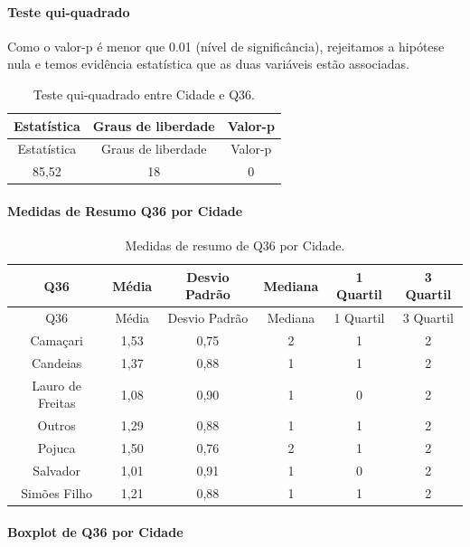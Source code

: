 \documentclass[]{article}
\let\oldparagraph\paragraph
\renewcommand{\paragraph}[1]{\oldparagraph{#1}\mbox{}}
\begin{document}
\hypertarget{teste-qui-quadrado-112}{%
\paragraph{Teste qui-quadrado}\label{teste-qui-quadrado-112}}

Como o valor-p é menor que 0.01 (nível de significância), rejeitamos a hipótese nula e temos evidência estatística que as duas variáveis estão associadas.

\begin{longtable}[]{@{}ccc@{}}
\caption{\label{tab:unnamed-chunk-1314}Teste qui-quadrado entre Cidade e Q36.}\tabularnewline
\toprule
Estatística & Graus de liberdade & Valor-p\tabularnewline
\midrule
\endfirsthead
\toprule
Estatística & Graus de liberdade & Valor-p\tabularnewline
\midrule
\endhead
85,52 & 18 & 0\tabularnewline
\bottomrule
\end{longtable}

\cleardoublepage

\hypertarget{medidas-de-resumo-q36-por-cidade}{%
\paragraph{Medidas de Resumo Q36 por Cidade}\label{medidas-de-resumo-q36-por-cidade}}

\begin{longtable}[]{@{}cccccc@{}}
\caption{\label{tab:unnamed-chunk-1315}Medidas de resumo de Q36 por Cidade.}\tabularnewline
\toprule
Q36 & Média & Desvio Padrão & Mediana & 1 Quartil & 3 Quartil\tabularnewline
\midrule
\endfirsthead
\toprule
Q36 & Média & Desvio Padrão & Mediana & 1 Quartil & 3 Quartil\tabularnewline
\midrule
\endhead
Camaçari & 1,53 & 0,75 & 2 & 1 & 2\tabularnewline
Candeias & 1,37 & 0,88 & 1 & 1 & 2\tabularnewline
Lauro de Freitas & 1,08 & 0,90 & 1 & 0 & 2\tabularnewline
Outros & 1,29 & 0,88 & 1 & 1 & 2\tabularnewline
Pojuca & 1,50 & 0,76 & 2 & 1 & 2\tabularnewline
Salvador & 1,01 & 0,91 & 1 & 0 & 2\tabularnewline
Simões Filho & 1,21 & 0,88 & 1 & 1 & 2\tabularnewline
\bottomrule
\end{longtable}

\hypertarget{boxplot-de-q36-por-cidade}{%
\paragraph{Boxplot de Q36 por Cidade}\label{boxplot-de-q36-por-cidade}}
\end{document}
